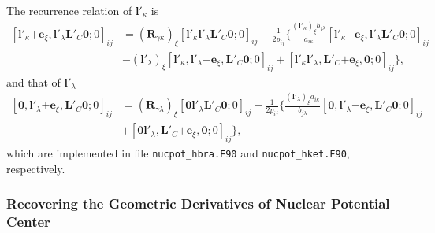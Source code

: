 \documentclass[a4paper,11pt,twoside,openright]{book}
\begin{document}
The recurrence relation of $\boldsymbol{l}'_{\kappa}$ is~\cite{Gao:IJQC:2010}
\begin{align}
  \label{eq:r-1-geo-bra}
  \left[\boldsymbol{l}'_{\kappa}\mathrm{+}\boldsymbol{e}_{\xi},\boldsymbol{l}'_{\lambda}%
    \boldsymbol{L}'_{C}\boldsymbol{0};0\right]_{ij}
  &=(\boldsymbol{R}_{\gamma\kappa})_{\xi}\left[\boldsymbol{l}'_{\kappa}\boldsymbol{l}'_{\lambda}%
      \boldsymbol{L}'_{C}\boldsymbol{0};0\right]_{ij}%
    -\frac{1}{2p_{ij}}\biggl\{\frac{(\boldsymbol{l}'_{\kappa})_{\xi}b_{j\lambda}}{a_{i\kappa}}%
      \left[\boldsymbol{l}'_{\kappa}\mathrm{-}\boldsymbol{e}_{\xi},\boldsymbol{l}'_{\lambda}%
      \boldsymbol{L}'_{C}\boldsymbol{0};0\right]_{ij}\\
  &-(\boldsymbol{l}'_{\lambda})_{\xi}\left[\boldsymbol{l}'_{\kappa},%
    \boldsymbol{l}'_{\lambda}\mathrm{-}\boldsymbol{e}_{\xi},\boldsymbol{L}'_{C}\boldsymbol{0};0\right]_{ij}
    +\left[\boldsymbol{l}'_{\kappa}\boldsymbol{l}'_{\lambda},%
      \boldsymbol{L}'_{C}\mathrm{+}\boldsymbol{e}_{\xi},\boldsymbol{0};0\right]_{ij}\biggr\},\nonumber
\end{align}
and that of $\boldsymbol{l}'_{\lambda}$~\cite{Gao:IJQC:2010}
\begin{align}
  \label{eq:r-1-geo-ket}
  \left[\boldsymbol{0},\boldsymbol{l}'_{\lambda}\mathrm{+}\boldsymbol{e}_{\xi},%
    \boldsymbol{L}'_{C}\boldsymbol{0};0\right]_{ij}
  &=(\boldsymbol{R}_{\gamma\lambda})_{\xi}\left[\boldsymbol{0}\boldsymbol{l}'_{\lambda}%
      \boldsymbol{L}'_{C}\boldsymbol{0};0\right]_{ij}%
    -\frac{1}{2p_{ij}}\biggl\{\frac{(\boldsymbol{l}'_{\lambda})_{\xi}a_{i\kappa}}{b_{j\lambda}}%
      \left[\boldsymbol{0},\boldsymbol{l}'_{\lambda}\mathrm{-}\boldsymbol{e}_{\xi},%
      \boldsymbol{L}'_{C}\boldsymbol{0};0\right]_{ij}\\
  &+\left[\boldsymbol{0}\boldsymbol{l}'_{\lambda},%
      \boldsymbol{L}'_{C}\mathrm{+}\boldsymbol{e}_{\xi},\boldsymbol{0};0\right]_{ij}\biggr\},\nonumber
\end{align}
which are implemented in file \verb|nucpot_hbra.F90| and \verb|nucpot_hket.F90|, respectively.

\subsubsection{Recovering the Geometric Derivatives of Nuclear Potential Center}
\end{document}
